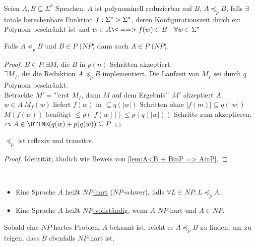 \begin{Def}[name={[Polynominell reduzeduzierbare Sprache $A\preceq_p B$]}]
	Seien $A,B\subseteq\Sigma^*$ Sprachen. $A$ ist polynominell reduzierbar auf $B$, $A\preceq_p B$, falls $\exists$ totale berechenbare Funktion $f:\Sigma^*\->\Sigma^*$, deren Konfigurationszeit durch ein Polynom beschränkt ist und $w\in A \<==> f(w)\in B\quad \forall w\in\Sigma^*$
\end{Def}
\begin{lemma}\label{lem:A<B + BinP => AinP}
	Falls $A\preceq_p B$ und $B\in P$ ($NP$) dann auch $A\in P$ ($NP$).
\end{lemma}
\begin{proof}
	$B\in P: \exists M$, die $B$ in $p(n)$ Schritten akzeptiert.\\
	$\exists M_f$, die die Reduktion $A\preceq_p B$ implementiert. Die Laufzeit von $M_f$ sei durch $q$ Polynom beschränkt.\\
	Betrachte $M'=$"'erst $M_f$, dann $M$ auf dem Ergebnis"'
	$M'$ akzeptiert $A$.\\
	$w\in A\ M_f(w)$ liefert $f(w)$ in $\subseteq q(|w|)$ Schritten ohne $|f(m)|\subseteq q(|w|)$\\
	$M(f(w))$ benötigt $\leq p(|f(w)|)\leq p(q(|w|))$ Schritte zum akzeptieren.\\
	$\curvearrowright A\in \DTIME(q(w)+p(q(w))\subseteq P$
\end{proof}
\begin{lemma}[name={[$\preceq_p$ ist reflexiv und transitiv]}]
	$\preceq_p$ ist reflexiv und transitiv.
\end{lemma}
\begin{proof}
	Identität; ähnlich wie Beweis von \autoref{lem:A<B + BinP => AinP}.
\end{proof}
\begin{Def}[name={[$NP$-hart und $NP$-vollständig]}]\
	\begin{itemize}
	\item Eine Sprache $A$ heißt \underline{$NP$-hart} ($NP$-schwer), falls $\forall L\in NP : L\preceq_p A$.
	\item Eine Sprache $A$ heißt \underline{$NP$-vollständig}, wenn $A$ $NP$-hart und $A\in NP$. \qedhere
	\end{itemize}
\end{Def}
\begin{Bem}
	Sobald eine $NP$-hartes Problem $A$ bekannt ist, reicht es $A\preceq_p B$ zu finden, um zu teigen, dass $B$ ebenfalls $NP$-hart ist.
\end{Bem}
